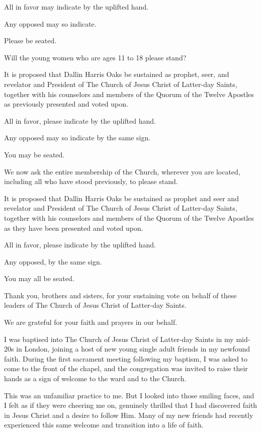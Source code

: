 \documentclass[letterpaper, 11pt]{report}
\newcommand{\speaker}{}
\newcommand{\talk}{}
\newcommand{\talkdatestr}{}
\newcommand{\setspeaker}[1]{\renewcommand{\speaker}{#1}}
\newcommand{\settalk}[1]{\renewcommand{\talk}{#1}}
\newcommand{\talkheading}[2]{%
    \vspace{1em}
    \noindent{\huge\bfseries #1}
    \par\nopagebreak\vspace{0.25em}
    \noindent{\normalsize\bfseries #2\ifx\talkdatestr\empty\else,\ \talkdatestr\fi}
    \par\nopagebreak\vspace{0.5em}
}
\begin{document}
All in favor may indicate by the uplifted hand.

Any opposed may so indicate.

Please be seated.

Will the young women who are ages 11 to 18 please stand?

It is proposed that Dallin Harris Oaks be sustained as prophet, seer, and revelator and President of The Church of Jesus Christ of Latter-day Saints, together with his counselors and members of the Quorum of the Twelve Apostles as previously presented and voted upon.

All in favor, please indicate by the uplifted hand.

Any opposed may so indicate by the same sign.

You may be seated.

We now ask the entire membership of the Church, wherever you are located, including all who have stood previously, to please stand.

It is proposed that Dallin Harris Oaks be sustained as prophet and seer and revelator and President of The Church of Jesus Christ of Latter-day Saints, together with his counselors and members of the Quorum of the Twelve Apostles as they have been presented and voted upon.

All in favor, please indicate by the uplifted hand.

Any opposed, by the same sign.

You may all be seated.

Thank you, brothers and sisters, for your sustaining vote on behalf of these leaders of The Church of Jesus Christ of Latter-day Saints.

We are grateful for your faith and prayers in our behalf.

\newpage
\settalk{About His Business}
\setspeaker{Patrick Kearon}
\talkheading{About His Business}{Patrick Kearon}

I was baptised into The Church of Jesus Christ of Latter-day Saints in my mid-20s in London, joining a host of new young single adult friends in my newfound faith. During the first sacrament meeting following my baptism, I was asked to come to the front of the chapel, and the congregation was invited to raise their hands as a sign of welcome to the ward and to the Church.

This was an unfamiliar practice to me. But I looked into those smiling faces, and I felt as if they were cheering me on, genuinely thrilled that I had discovered faith in Jesus Christ and a desire to follow Him. Many of my new friends had recently experienced this same welcome and transition into a life of faith.
\end{document}

